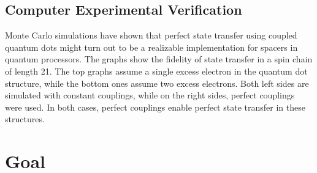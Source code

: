 \subsection{Computer Experimental Verification}

\begin{center}
\end{center}

\noindent Monte Carlo simulations have shown\cite{Nikolopoulos2004} that perfect state transfer using coupled quantum dots might turn out to be a realizable implementation for spacers in quantum processors. The graphs show the fidelity of state transfer in a spin chain of length 21. The top graphs assume a single excess electron in the quantum dot structure, while the bottom ones assume two excess electrons. Both left sides are simulated with constant couplings, while on the right sides, perfect couplings were used. In both cases, perfect couplings enable perfect state transfer in these structures. 

\section{Goal}

